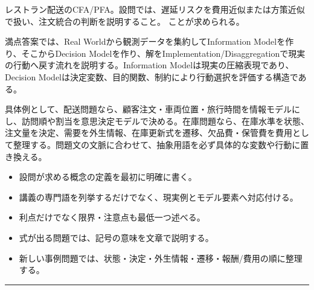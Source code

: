 \clearpage{}
レストラン配送のCFA/PFA。設問では、遅延リスクを費用近似または方策近似で扱い、注文統合の判断を説明すること。 ことが求められる。\par
{}
満点答案では、Real Worldから観測データを集約してInformation Modelを作り、そこからDecision Modelを作り、解をImplementation/Disaggregationで現実の行動へ戻す流れを説明する。Information Modelは現実の圧縮表現であり、Decision Modelは決定変数、目的関数、制約により行動選択を評価する構造である。\par
{}
具体例として、配送問題なら、顧客注文・車両位置・旅行時間を情報モデルにし、訪問順や割当を意思決定モデルで決める。在庫問題なら、在庫水準を状態、注文量を決定、需要を外生情報、在庫更新式を遷移、欠品費・保管費を費用として整理する。問題文の文脈に合わせて、抽象用語を必ず具体的な変数や行動に置き換える。\par
{}
\begin{itemize}
\item 設問が求める概念の定義を最初に明確に書く。
\item 講義の専門語を列挙するだけでなく、現実例とモデル要素へ対応付ける。
\item 利点だけでなく限界・注意点も最低一つ述べる。
\item 式が出る問題では、記号の意味を文章で説明する。
\item 新しい事例問題では、状態・決定・外生情報・遷移・報酬/費用の順に整理する。
\end{itemize}
\vspace{2mm}\hrule\vspace{2mm}